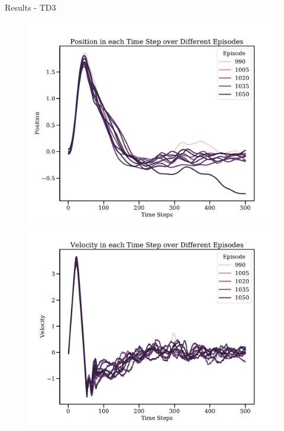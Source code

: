 \documentclass[10pt]{beamer}
\begin{document}
\begin{frame}[fragile]{Results - TD3}
\begin{figure}[!htb]
  \includegraphics[width=\linewidth]{../results/td3_res_Position.pdf}
\endminipage\hfill
{}
  \includegraphics[width=\linewidth]{../results/td3_res_Velocity.pdf}
\endminipage\hfill
\end{figure}

\end{frame}
\end{document}
